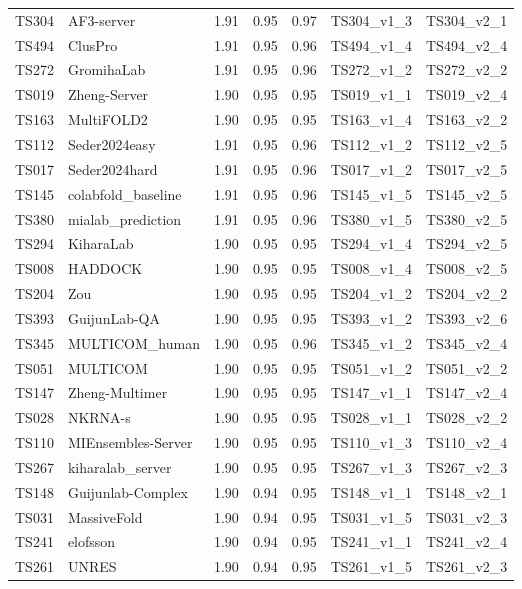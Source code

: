 \begin{longtable}{lllllll}
TS304 & AF3-server & 1.91 & 0.95 & 0.97 & TS304\_v1\_3 & TS304\_v2\_1 \\ 
TS494 & ClusPro & 1.91 & 0.95 & 0.96 & TS494\_v1\_4 & TS494\_v2\_4 \\ 
TS272 & GromihaLab & 1.91 & 0.95 & 0.96 & TS272\_v1\_2 & TS272\_v2\_2 \\ 
TS019 & Zheng-Server & 1.90 & 0.95 & 0.95 & TS019\_v1\_1 & TS019\_v2\_4 \\ 
TS163 & MultiFOLD2 & 1.90 & 0.95 & 0.95 & TS163\_v1\_4 & TS163\_v2\_2 \\ 
TS112 & Seder2024easy & 1.91 & 0.95 & 0.96 & TS112\_v1\_2 & TS112\_v2\_5 \\ 
TS017 & Seder2024hard & 1.91 & 0.95 & 0.96 & TS017\_v1\_2 & TS017\_v2\_5 \\ 
TS145 & colabfold\_baseline & 1.91 & 0.95 & 0.96 & TS145\_v1\_5 & TS145\_v2\_5 \\ 
TS380 & mialab\_prediction & 1.91 & 0.95 & 0.96 & TS380\_v1\_5 & TS380\_v2\_5 \\ 
TS294 & KiharaLab & 1.90 & 0.95 & 0.95 & TS294\_v1\_4 & TS294\_v2\_5 \\ 
TS008 & HADDOCK & 1.90 & 0.95 & 0.95 & TS008\_v1\_4 & TS008\_v2\_5 \\ 
TS204 & Zou & 1.90 & 0.95 & 0.95 & TS204\_v1\_2 & TS204\_v2\_2 \\ 
TS393 & GuijunLab-QA & 1.90 & 0.95 & 0.95 & TS393\_v1\_2 & TS393\_v2\_6 \\ 
TS345 & MULTICOM\_human & 1.90 & 0.95 & 0.96 & TS345\_v1\_2 & TS345\_v2\_4 \\ 
TS051 & MULTICOM & 1.90 & 0.95 & 0.95 & TS051\_v1\_2 & TS051\_v2\_2 \\ 
TS147 & Zheng-Multimer & 1.90 & 0.95 & 0.95 & TS147\_v1\_1 & TS147\_v2\_4 \\ 
TS028 & NKRNA-s & 1.90 & 0.95 & 0.95 & TS028\_v1\_1 & TS028\_v2\_2 \\ 
TS110 & MIEnsembles-Server & 1.90 & 0.95 & 0.95 & TS110\_v1\_3 & TS110\_v2\_4 \\ 
TS267 & kiharalab\_server & 1.90 & 0.95 & 0.95 & TS267\_v1\_3 & TS267\_v2\_3 \\ 
TS148 & Guijunlab-Complex & 1.90 & 0.94 & 0.95 & TS148\_v1\_1 & TS148\_v2\_1 \\ 
TS031 & MassiveFold & 1.90 & 0.94 & 0.95 & TS031\_v1\_5 & TS031\_v2\_3 \\ 
TS241 & elofsson & 1.90 & 0.94 & 0.95 & TS241\_v1\_1 & TS241\_v2\_4 \\ 
TS261 & UNRES & 1.90 & 0.94 & 0.95 & TS261\_v1\_5 & TS261\_v2\_3 \\ 

\end{longtable}
